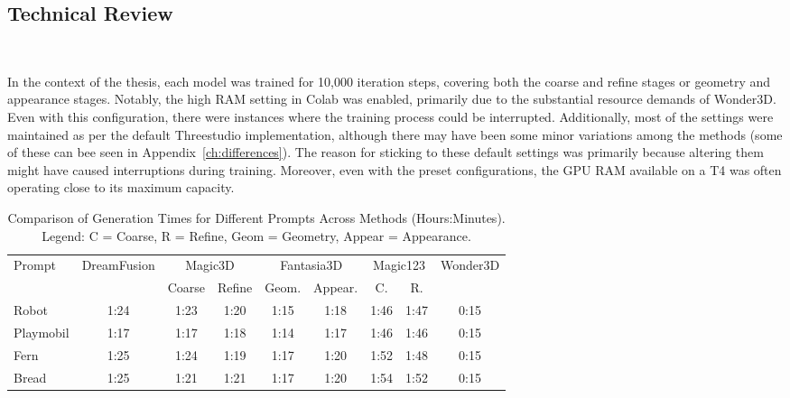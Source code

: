 \subsection{Technical Review}~\label{technical}

In the context of the thesis, each model was trained for 10,000 iteration steps, covering both the coarse and refine stages or geometry and appearance stages. Notably, the high RAM setting in Colab was enabled, primarily due to the substantial resource demands of Wonder3D. Even with this configuration, there were instances where the training process could be interrupted. Additionally, most of the settings were maintained as per the default Threestudio implementation, although there may have been some minor variations among the methods (some of these can bee seen in Appendix~\ref{ch:differences}). The reason for sticking to these default settings was primarily because altering them might have caused interruptions during training. Moreover, even with the preset configurations, the GPU RAM available on a T4 was often operating close to its maximum capacity.

\begin{table}[ht]
    \centering
    \small 
    \begin{tabular}{lcccccccc}
    \toprule
    Prompt & DreamFusion & \multicolumn{2}{c}{Magic3D} & \multicolumn{2}{c}{Fantasia3D} & \multicolumn{2}{c}{Magic123} & Wonder3D \\
    \cmidrule(r){3-4} \cmidrule(lr){5-6} \cmidrule(l){7-8}
    & & \multicolumn{1}{c}{Coarse} & \multicolumn{1}{c}{Refine} & \multicolumn{1}{c}{Geom.} & \multicolumn{1}{c}{Appear.} & \multicolumn{1}{c}{C.} & \multicolumn{1}{c}{R.} &  \\
    \midrule
    Robot & 1:24 & 1:23 & 1:20 & 1:15 & 1:18 & 1:46 & 1:47 & 0:15 \\
    Playmobil & 1:17 & 1:17 & 1:18 & 1:14 & 1:17 & 1:46 & 1:46 & 0:15 \\
    Fern & 1:25 & 1:24 & 1:19 & 1:17 & 1:20 & 1:52 & 1:48 & 0:15 \\
    Bread & 1:25 & 1:21 & 1:21 & 1:17 & 1:20 & 1:54 & 1:52 & 0:15 \\
    \bottomrule
    \end{tabular}
    \caption{Comparison of Generation Times for Different Prompts Across Methods (Hours:Minutes). Legend: C = Coarse, R = Refine, Geom = Geometry, Appear = Appearance.}~\label{table:generation_times_complex}
\end{table}

